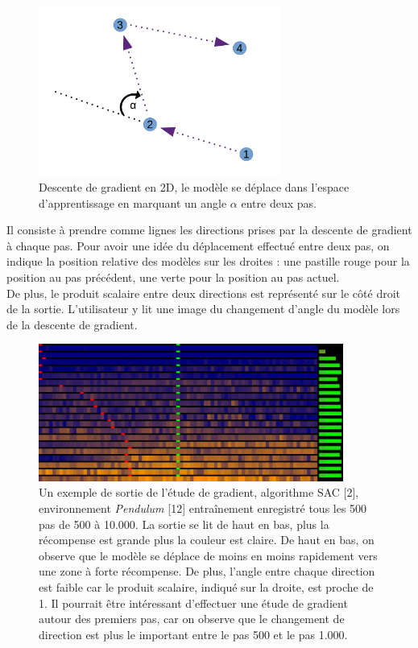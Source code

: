 \documentclass[12pt]{article}
\begin{document}
\begin{figure}[!htp]
    \centering
    \includegraphics[width=8cm]{Images/gradientStudy_dessus}
    \caption{Descente de gradient en 2D, le modèle se déplace dans l'espace d'apprentissage en marquant un angle $\alpha$ entre deux pas.}
    \label{fig:gradientStudyAbove}
\end{figure}

Il consiste à prendre comme lignes les directions prises par la descente de gradient à chaque pas. Pour avoir une idée du déplacement effectué entre deux pas, on indique la position relative des modèles sur les droites : une pastille rouge pour la position au pas précédent, une verte pour la position au pas actuel. \\

De plus, le produit scalaire entre deux directions est représenté sur le côté droit de la sortie. L'utilisateur y lit une image du changement d'angle du modèle lors de la descente de gradient. \\

\begin{figure}[!htp]
    \centering
    \includegraphics[width=10cm]{Images/gradientStudy}
    \caption{Un exemple de sortie de l'étude de gradient, algorithme SAC [2], environnement \emph{Pendulum} [12] entraînement enregistré tous les 500 pas de 500 à 10.000. La sortie se lit de haut en bas, plus la récompense est grande plus la couleur est claire. De haut en bas, on observe que le modèle se déplace de moins en moins rapidement vers une zone à forte récompense. De plus, l'angle entre chaque direction est faible car le produit scalaire, indiqué sur la droite, est proche de 1. Il pourrait être intéressant d'effectuer une étude de gradient autour des premiers pas, car on observe que le changement de direction est plus le important entre le pas 500 et le pas 1.000.}
    \label{fig:gradientStudy}
\end{figure}
\end{document}
